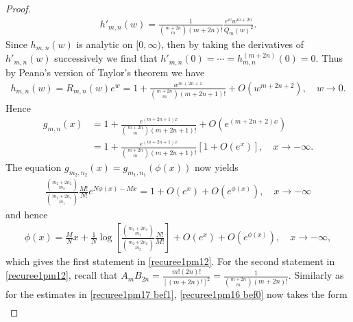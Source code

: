 \documentclass[12pt]{amsart}
\numberwithin{equation}{section}
\begin{document}
\begin{proof}
\begin{equation*}%
\begin{split}
h'_{m,n}(w)=\frac{1}{\binom{m+2n}{m}(m+2n)!}\frac{e^ww^{m+2n}}{Q_m(w)^2}.
\end{split}
\end{equation*}
Since $h_{m,n}(w)$ is analytic on $[0,\infty)$, then by taking the derivatives of $h'_{m,n}(w)$ successively we find that $h'_{m,n}(0)=\cdots=h^{(m+2n)}_{m,n}(0)=0$. Thus by Peano's version of Taylor's theorem we have
\begin{equation*}%
\begin{split}
h_{m,n}(w)=R_{m,n}(w)e^{w}=1+\frac{w^{m+2n+1}}{\binom{m+2n}{m}(m+2n+1)!}+O(w^{m+2n+2}), \quad w\to 0.
\end{split}
\end{equation*}
Hence
\begin{equation*}%
\begin{split}
g_{m,n}(x)&=1+\frac{e^{(m+2n+1)x}}{\binom{m+2n}{m}(m+2n+1)!}+O(e^{(m+2n+2)x})\\
&=1+\frac{e^{(m+2n+1)x}}{\binom{m+2n}{m}(m+2n+1)!}\left[1+O(e^{x})\right], \quad x\to-\infty.
\end{split}
\end{equation*}
The equation $g_{m_2,n_2}(x)=g_{m_1,n_1}(\phi(x))$ now yields
\begin{equation*}%
\begin{split}
\frac{\binom{m_2+2n_2}{m_2}}{\binom{m_1+2n_1}{m_1}}\frac{M!}{N!}e^{N\phi(x)-Mx}=1+O(e^{x})+O(e^{\phi(x)}), \quad x\to-\infty
\end{split}
\end{equation*}
and hence
\begin{equation*}%
\begin{split}
\phi(x)=\frac{M}{N}x+\frac{1}{N}\log \left[\frac{\binom{m_1+2n_1}{m_1}}{\binom{m_2+2n_2}{m_2}}\frac{N!}{M!}\right]+O(e^{x})+O(e^{\phi(x)}), \quad x\to-\infty,
\end{split}
\end{equation*}
which gives the first statement in \eqref{recuree1pm12}. For the second statement in \eqref{recuree1pm12}, recall that $A_{m}B_{2n}=\frac{m!(2n)!}{[(m+2n)!]^2}=\frac{1}{\binom{m+2n}{m}(m+2n)!}$. Similarly as for the estimates in \eqref{recuree1pm17 bef1}, \eqref{recuree1pm16  bef0} now takes the form
\begin{equation*}%
\begin{split}

\end{split}
\end{equation*}
\end{proof}
\end{document}
